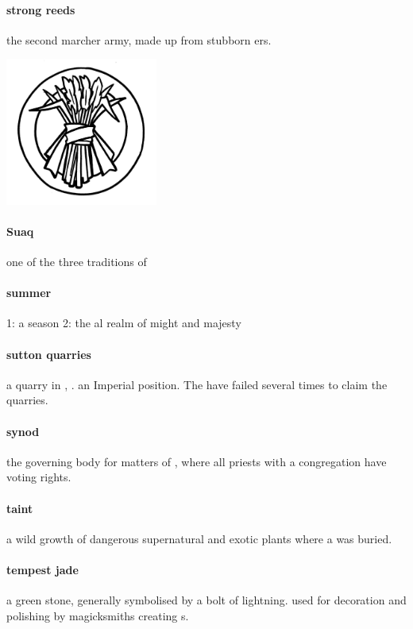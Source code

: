 \paragraph{strong reeds} the second marcher army, made up from stubborn ers.\begin{center}\includegraphics[width=5cm]{encyclopedia/StrongReeds}\end{center}
\paragraph{Suaq} one of the three traditions of 
\paragraph{summer} 1: a season 2: the al realm of might and majesty
\paragraph{sutton quarries} a  quarry in , . an Imperial  position. The  have failed several times to claim the quarries.
\paragraph{synod} the governing body for matters of , where all priests with a congregation have voting rights.
\paragraph{taint} a wild growth of dangerous supernatural and exotic plants where a  was buried.
\paragraph{tempest jade} a green stone, generally symbolised by a bolt of lightning. used for decoration and polishing by magicksmiths creating s. 
